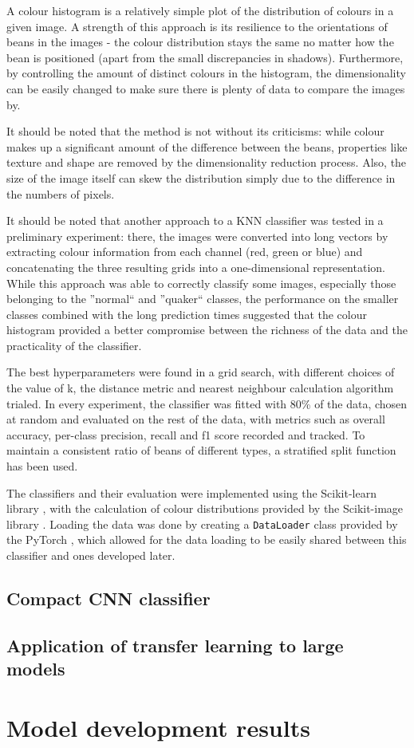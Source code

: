 A colour histogram is a relatively simple plot of the distribution of colours in a given image.
A strength of this approach is its resilience to the orientations of beans in the images - the colour distribution stays
the same no matter how the bean is positioned (apart from the small discrepancies in shadows).
Furthermore, by controlling the amount of distinct colours in the histogram, the dimensionality can be easily changed to
make sure there is plenty of data to compare the images by.

It should be noted that the method is not without its criticisms: while colour makes up a significant amount of the difference
between the beans, properties like texture and shape are removed by the dimensionality reduction process.
Also, the size of the image itself can skew the distribution simply due to the difference in the numbers of pixels.

It should be noted that another approach to a KNN classifier was tested in a preliminary experiment:
there, the images were converted into long vectors by extracting colour information from each channel (red, green or blue)
and concatenating the three resulting grids into a one-dimensional representation.
While this approach was able to correctly classify some images, especially those belonging to the ''normal`` and ''quaker``
classes, the performance on the smaller classes combined with the long prediction times suggested that the colour histogram
provided a better compromise between the richness of the data and the practicality of the classifier.

The best hyperparameters were found in a grid search, with different choices of the value of k, the distance metric
and nearest neighbour calculation algorithm trialed.
In every experiment, the classifier was fitted with 80\% of the data, chosen at random and evaluated on the rest of the data,
with metrics such as overall accuracy, per-class precision, recall and f1 score recorded and tracked.
To maintain a consistent ratio of beans of different types, a stratified split function has been used.

The classifiers and their evaluation were implemented using the Scikit-learn library \cite{sklearnLibrary}, with the calculation of colour
distributions provided by the Scikit-image library \cite{skImageLibrary}.
Loading the data was done by creating a \verb|DataLoader| class provided by the PyTorch \cite{pytorchLibrary}, which allowed
for the data loading to be easily shared between this classifier and ones developed later.
\subsection{Compact CNN classifier}
\label{subsec:deep-learning}

\subsection{Application of transfer learning to large models}
\label{subsec:transfer-learning}

\section{Model development results}
\label{sec:model-development-results}